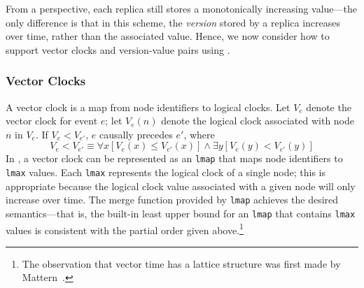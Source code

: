 From a \lang perspective, each replica still stores a monotonically increasing
value---the only difference is that in this scheme, the \emph{version} stored by
a replica increases over time, rather than the associated value. Hence, we now
consider how to support vector clocks and version-value pairs using \lang.

\subsubsection{Vector Clocks}
A vector clock is a map from node identifiers to logical clocks. Let $V_e$
denote the vector clock for event $e$; let $V_e(n)$ denote the logical clock
associated with node $n$ in $V_e$. If $V_e < V_{e'}$, $e$ causally precedes
$e'$, where
\begin{displaymath}
V_e < V_{e'} \equiv \forall x [ V_e(x) \leq V_{e'}(x) ] \land \exists y [ V_e(y) < V_{e'}(y) ]  
\end{displaymath}
In \lang, a vector clock can be represented as an \texttt{lmap} that maps node
identifiers to \texttt{lmax} values. Each \texttt{lmax} represents the logical
clock of a single node; this is appropriate because the logical clock value
associated with a given node will only increase over time. The merge function
provided by \texttt{lmap} achieves the desired semantics---that is, the built-in
least upper bound for an \texttt{lmap} that contains \texttt{lmax} values is
consistent with the partial order given above.\footnote{The observation that
  vector time has a lattice structure was first made by
  Mattern~\cite{Mattern1989}.}

